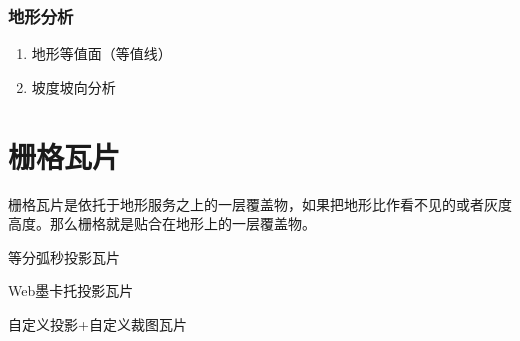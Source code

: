 \subsubsection{地形分析}
\begin{enumerate}
	\item 地形等值面（等值线）
	\item 坡度坡向分析
\end{enumerate}


\section{栅格瓦片}
\label{sec:cesium-raster}
栅格瓦片是依托于地形服务之上的一层覆盖物，如果把地形比作看不见的或者灰度高度。那么栅格就是贴合在地形上的一层覆盖物。

\begin{introduction}
	\item 等分弧秒投影瓦片
	\item Web墨卡托投影瓦片
	\item 自定义投影+自定义裁图瓦片
\end{introduction}

